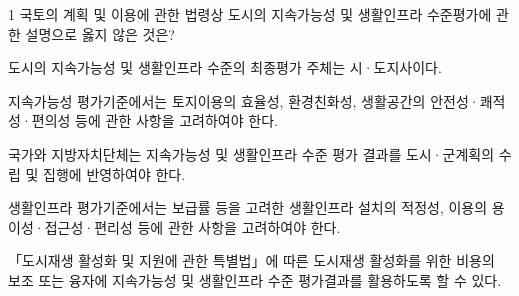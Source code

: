 \begin{question}{1}
국토의 계획 및 이용에 관한 법령상 도시의 지속가능성 및 생활인프라 수준평가에 관한 설명으로 옳지 않은 것은?
\begin{choices}
  \item 도시의 지속가능성 및 생활인프라 수준의 최종평가 주체는 시·도지사이다.
  \item 지속가능성 평가기준에서는 토지이용의 효율성, 환경친화성, 생활공간의 안전성·쾌적성·편의성 등에 관한 사항을 고려하여야 한다.
  \item 국가와 지방자치단체는 지속가능성 및 생활인프라 수준 평가 결과를 도시·군계획의 수립 및 집행에 반영하여야 한다.
  \item 생활인프라 평가기준에서는 보급률 등을 고려한 생활인프라 설치의 적정성, 이용의 용이성·접근성·편리성 등에 관한 사항을 고려하여야 한다.
  \item 「도시재생 활성화 및 지원에 관한 특별법」에 따른 도시재생 활성화를 위한 비용의 보조 또는 융자에 지속가능성 및 생활인프라 수준 평가결과를 활용하도록 할 수 있다.
\end{choices}
\end{question}
